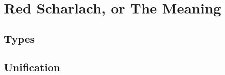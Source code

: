 \chapter{Red Scharlach, or The Meaning}\label{ch:RSM}

\section{Types}\label{sec:ch2_types}
\section{Unification}\label{sec:ch2_unification}
